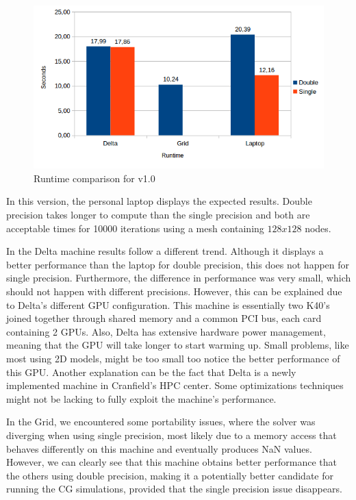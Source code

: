 \documentclass[12pt]{book}
\begin{document}
  \begin{figure}[H]
  	\centering
  	\includegraphics[width=\linewidth]{Resources/Images/v1.png}
  	\caption{Runtime comparison for v1.0}
  	\label{fig:v1}
  \end{figure}
  
  In this version, the personal laptop displays the expected results. Double precision takes longer to compute than the single precision and both are acceptable times for 10000 iterations using a mesh containing $128x128$ nodes. \par
  In the Delta machine results follow a different trend. Although it displays a better performance than the laptop for double precision, this does not happen for single precision. Furthermore, the difference in performance was very small, which should not happen with different precisions. However, this can be explained due to Delta's different GPU configuration. This machine is essentially two K40's joined together through shared memory and a common PCI bus, each card containing 2 GPUs. Also, Delta has extensive hardware power management, meaning that the GPU will take longer to start warming up. Small problems, like most using 2D models, might be too small too notice the better performance of this GPU. Another explanation can be the fact that Delta is a newly implemented machine in Cranfield's HPC center. Some optimizations techniques might not be lacking to fully exploit the machine's performance.\par
  In the Grid, we encountered some portability issues, where the solver was diverging when using single precision, most likely due to a memory access that behaves differently on this machine and eventually produces NaN values. However, we can clearly see that this machine obtains better performance that the others using double precision, making it a potentially better candidate for running the CG simulations, provided that the single precision issue disappears.  
  
\end{document}
